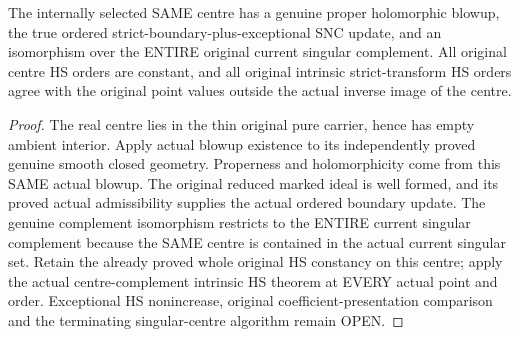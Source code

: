 \begin{theorem}
\label{hir:actual-original-hs-constant-singular-centre-proper-blowup}
\leanok
The internally selected SAME centre has a genuine proper holomorphic
blowup, the true ordered strict-boundary-plus-exceptional SNC update,
and an isomorphism over the ENTIRE original current singular complement.
All original centre HS orders are constant, and all original intrinsic
strict-transform HS orders agree with the original point values outside
the actual inverse image of the centre.
\end{theorem}
\begin{proof}
The real centre lies in the thin original pure carrier, hence has empty
ambient interior. Apply actual blowup existence to its independently
proved genuine smooth closed geometry. Properness and holomorphicity
come from this SAME actual blowup. The original reduced marked ideal is
well formed, and its proved actual admissibility supplies the actual
ordered boundary update. The genuine complement isomorphism restricts
to the ENTIRE current singular complement because the SAME centre is
contained in the actual current singular set. Retain the already proved
whole original HS constancy on this centre; apply the actual
centre-complement intrinsic HS theorem at EVERY actual point and order.
Exceptional HS nonincrease, original coefficient-presentation comparison
and the terminating singular-centre algorithm remain OPEN.
\end{proof}
